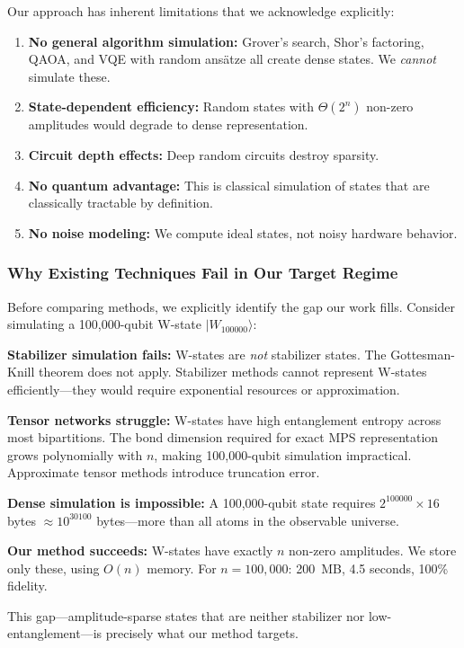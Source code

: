 \documentclass[11pt,twocolumn]{article}
\begin{document}
Our approach has inherent limitations that we acknowledge explicitly:

\begin{enumerate}
    \item \textbf{No general algorithm simulation:} Grover's search, Shor's factoring, QAOA, and VQE with random ans\"atze all create dense states. We \emph{cannot} simulate these.
    \item \textbf{State-dependent efficiency:} Random states with $\Theta(2^n)$ non-zero amplitudes would degrade to dense representation.
    \item \textbf{Circuit depth effects:} Deep random circuits destroy sparsity.
    \item \textbf{No quantum advantage:} This is classical simulation of states that are classically tractable by definition.
    \item \textbf{No noise modeling:} We compute ideal states, not noisy hardware behavior.
\end{enumerate}

\subsubsection{Why Existing Techniques Fail in Our Target Regime}

Before comparing methods, we explicitly identify the gap our work fills. Consider simulating a 100,000-qubit W-state $|W_{100000}\rangle$:

\textbf{Stabilizer simulation fails:} W-states are \emph{not} stabilizer states. The Gottesman-Knill theorem does not apply. Stabilizer methods cannot represent W-states efficiently---they would require exponential resources or approximation.

\textbf{Tensor networks struggle:} W-states have high entanglement entropy across most bipartitions. The bond dimension required for exact MPS representation grows polynomially with $n$, making 100,000-qubit simulation impractical. Approximate tensor methods introduce truncation error.

\textbf{Dense simulation is impossible:} A 100,000-qubit state requires $2^{100000} \times 16$ bytes $\approx 10^{30100}$ bytes---more than all atoms in the observable universe.

\textbf{Our method succeeds:} W-states have exactly $n$ non-zero amplitudes. We store only these, using $O(n)$ memory. For $n = 100,000$: 200~MB, 4.5 seconds, 100\% fidelity.

This gap---amplitude-sparse states that are neither stabilizer nor low-entanglement---is precisely what our method targets.
\end{document}
